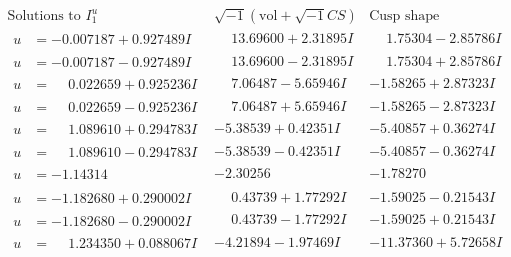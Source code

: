 \documentclass[1p]{elsarticle_modified}
\theoremstyle{definition}
\newcommand{\I}{\sqrt{-1}}
\begin{document}
$$\begin{array}{c|c|c}  
\text{Solutions to }I^u_{1}& \I (\text{vol} + \sqrt{-1}CS) & \text{Cusp shape}\\
 \hline 
\begin{aligned}
u &= -0.007187 + 0.927489 I\end{aligned}
 & \phantom{-}13.69600 + 2.31895 I & \phantom{-}1.75304 - 2.85786 I \\ \hline\begin{aligned}
u &= -0.007187 - 0.927489 I\end{aligned}
 & \phantom{-}13.69600 - 2.31895 I & \phantom{-}1.75304 + 2.85786 I \\ \hline\begin{aligned}
u &= \phantom{-}0.022659 + 0.925236 I\end{aligned}
 & \phantom{-}7.06487 - 5.65946 I & -1.58265 + 2.87323 I \\ \hline\begin{aligned}
u &= \phantom{-}0.022659 - 0.925236 I\end{aligned}
 & \phantom{-}7.06487 + 5.65946 I & -1.58265 - 2.87323 I \\ \hline\begin{aligned}
u &= \phantom{-}1.089610 + 0.294783 I\end{aligned}
 & -5.38539 + 0.42351 I & -5.40857 + 0.36274 I \\ \hline\begin{aligned}
u &= \phantom{-}1.089610 - 0.294783 I\end{aligned}
 & -5.38539 - 0.42351 I & -5.40857 - 0.36274 I \\ \hline\begin{aligned}
u &= -1.14314\phantom{ +0.000000I}\end{aligned}
 & -2.30256\phantom{ +0.000000I} & -1.78270\phantom{ +0.000000I} \\ \hline\begin{aligned}
u &= -1.182680 + 0.290002 I\end{aligned}
 & \phantom{-}0.43739 + 1.77292 I & -1.59025 - 0.21543 I \\ \hline\begin{aligned}
u &= -1.182680 - 0.290002 I\end{aligned}
 & \phantom{-}0.43739 - 1.77292 I & -1.59025 + 0.21543 I \\ \hline\begin{aligned}
u &= \phantom{-}1.234350 + 0.088067 I\end{aligned}
 & -4.21894 - 1.97469 I & -11.37360 + 5.72658 I \\ \hline\begin{aligned}

\end{aligned}
\end{array}$$
\end{document}
